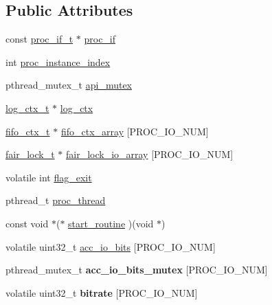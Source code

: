 \subsection*{Public Attributes}
\begin{DoxyCompactItemize}
\item 
const \hyperlink{proc_8h_a679816cf30e0b7a8f3e7464e67a6a844}{proc\+\_\+if\+\_\+t} $\ast$ \hyperlink{structproc__ctx__s_ae63f720fef21f807ed42fe76806140f6}{proc\+\_\+if}
\item 
int \hyperlink{structproc__ctx__s_a3912d4b5eaffcdaefa00f149ca4a8c63}{proc\+\_\+instance\+\_\+index}
\item 
pthread\+\_\+mutex\+\_\+t \hyperlink{structproc__ctx__s_aea90c57d9b0a303b638a51ce7efa9a1e}{api\+\_\+mutex}
\item 
\hyperlink{structlog__ctx__s}{log\+\_\+ctx\+\_\+t} $\ast$ \hyperlink{structproc__ctx__s_a7c58dee78b4d7834e4c2fe430cd267d5}{log\+\_\+ctx}
\item 
\hyperlink{structfifo__ctx__s}{fifo\+\_\+ctx\+\_\+t} $\ast$ \hyperlink{structproc__ctx__s_a3b71d039235f439a87d9ec7d7b5b5549}{fifo\+\_\+ctx\+\_\+array} \mbox{[}P\+R\+O\+C\+\_\+\+I\+O\+\_\+\+N\+UM\mbox{]}
\item 
\hyperlink{structfair__lock__s}{fair\+\_\+lock\+\_\+t} $\ast$ \hyperlink{structproc__ctx__s_a6529e1ba97566c429d658e121bb604bb}{fair\+\_\+lock\+\_\+io\+\_\+array} \mbox{[}P\+R\+O\+C\+\_\+\+I\+O\+\_\+\+N\+UM\mbox{]}
\item 
volatile int \hyperlink{structproc__ctx__s_a86a21b28f6c41f7a9a4cc9586f782d68}{flag\+\_\+exit}
\item 
pthread\+\_\+t \hyperlink{structproc__ctx__s_a09ad60355584215cfeb4d5589ee390b9}{proc\+\_\+thread}
\item 
const void $\ast$($\ast$ \hyperlink{structproc__ctx__s_a1149ce1c28aae8e553c85125e30be661}{start\+\_\+routine} )(void $\ast$)
\end{DoxyCompactItemize}
{\bf }\par
\begin{DoxyCompactItemize}
\item 
volatile uint32\+\_\+t \hyperlink{structproc__ctx__s_a63e59dc7c4a361ca2b52e2354f51c33a}{acc\+\_\+io\+\_\+bits} \mbox{[}P\+R\+O\+C\+\_\+\+I\+O\+\_\+\+N\+UM\mbox{]}
\item 
pthread\+\_\+mutex\+\_\+t {\bfseries acc\+\_\+io\+\_\+bits\+\_\+mutex} \mbox{[}P\+R\+O\+C\+\_\+\+I\+O\+\_\+\+N\+UM\mbox{]}\hypertarget{structproc__ctx__s_a486d5806453d8171e298c449c6391c1d}{}\label{structproc__ctx__s_a486d5806453d8171e298c449c6391c1d}

\item 
volatile uint32\+\_\+t {\bfseries bitrate} \mbox{[}P\+R\+O\+C\+\_\+\+I\+O\+\_\+\+N\+UM\mbox{]}\hypertarget{structproc__ctx__s_a31bad437eed5d81c08a01538416c3639}{}\label{structproc__ctx__s_a31bad437eed5d81c08a01538416c3639}

\end{DoxyCompactItemize}


